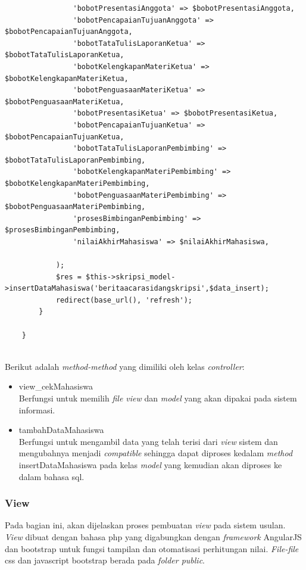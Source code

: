 \begin{lstlisting}
				'bobotPresentasiAnggota' => $bobotPresentasiAnggota,
				'bobotPencapaianTujuanAnggota' => $bobotPencapaianTujuanAnggota,
				'bobotTataTulisLaporanKetua' => $bobotTataTulisLaporanKetua,
				'bobotKelengkapanMateriKetua' => $bobotKelengkapanMateriKetua,
				'bobotPenguasaanMateriKetua' => $bobotPenguasaanMateriKetua,
				'bobotPresentasiKetua' => $bobotPresentasiKetua,
				'bobotPencapaianTujuanKetua' => $bobotPencapaianTujuanKetua,
				'bobotTataTulisLaporanPembimbing' => $bobotTataTulisLaporanPembimbing,
				'bobotKelengkapanMateriPembimbing' => $bobotKelengkapanMateriPembimbing,
				'bobotPenguasaanMateriPembimbing' => $bobotPenguasaanMateriPembimbing,
				'prosesBimbinganPembimbing' => $prosesBimbinganPembimbing,
				'nilaiAkhirMahasiswa' => $nilaiAkhirMahasiswa,
			
			);
			$res = $this->skripsi_model->insertDataMahasiswa('beritaacarasidangskripsi',$data_insert);
			redirect(base_url(), 'refresh');
		}
	
	}
	
\end{lstlisting}

Berikut adalah \textit{method-method} yang dimiliki oleh kelas \textit{controller}:
\begin{itemize}
	\item view\_cekMahasiswa\\
	Berfungsi untuk memilih \textit{file view} dan \textit{model} yang akan dipakai pada sistem informasi.
	\item tambahDataMahasiswa\\
	Berfungsi untuk mengambil data yang telah terisi dari \textit{view} sistem dan mengubahnya menjadi \textit{compatible} sehingga dapat diproses kedalam \textit{method} insertDataMahasiswa pada kelas \textit{model} yang kemudian akan diproses ke dalam bahasa sql.
\end{itemize}
	
	\subsubsection{View}
	\label{subsub: viewCI}
	
	Pada bagian ini, akan dijelaskan proses pembuatan \textit{view} pada sistem usulan. \textit{View} dibuat dengan bahasa php yang digabungkan dengan \textit{framework} AngularJS dan bootstrap untuk fungsi tampilan dan otomatisasi perhitungan nilai. \textit{File-file} css dan javascript bootstrap berada pada \textit{folder public}.
	
